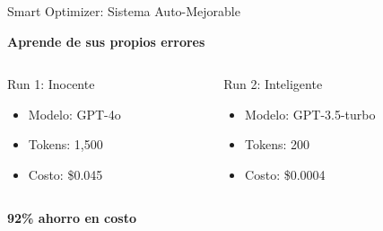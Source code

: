 \documentclass[aspectratio=169,14pt]{beamer}
\begin{document}
\begin{frame}{Smart Optimizer: Sistema Auto-Mejorable}

\begin{center}
\Large \textbf{Aprende de sus propios errores}
\end{center}

\vspace{0.5cm}

\begin{columns}[T]
\begin{column}{0.48\textwidth}
\begin{alertblock}{Run 1: Inocente}
\begin{itemize}
    \item Modelo: GPT-4o
    \item Tokens: 1,500
    \item Costo: \$0.045
\end{itemize}
\end{alertblock}
\end{column}

\begin{column}{0.48\textwidth}
\begin{exampleblock}{Run 2: Inteligente}
\begin{itemize}
    \item Modelo: GPT-3.5-turbo
    \item Tokens: 200
    \item Costo: \$0.0004
\end{itemize}
\end{exampleblock}
\end{column}
\end{columns}

\vspace{0.5cm}

\begin{center}
\LARGE
\textcolor{maingreen}{\textbf{92\% ahorro en costo}}
\end{center}

\end{frame}
\end{document}
